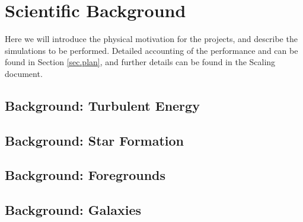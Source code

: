 \section{Scientific Background}
\label{sec.background}

Here we will introduce the physical motivation for the projects, and describe
the simulations to be performed.  Detailed accounting of the performance and
can be found in Section \ref{sec.plan}, and further details can be found in the
Scaling document.


\subsection{Background: Turbulent Energy}
\label{sec.back_turb}



\subsection{Background: Star Formation}
\label{sec.back_cores}



\subsection{Background: Foregrounds}
\label{sec.back_foregrounds}


\subsection{Background: Galaxies}
\label{sec.back_galaxies}


